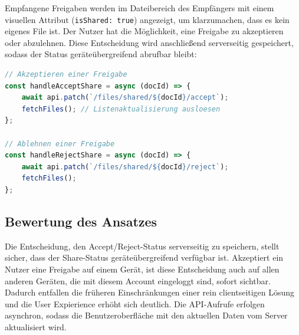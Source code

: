 Empfangene Freigaben werden im Dateibereich des Empfängers mit einem visuellen Attribut (\texttt{isShared: true}) angezeigt, um klarzumachen, dass es kein eigenes File ist. Der Nutzer hat die Möglichkeit, eine Freigabe zu akzeptieren oder abzulehnen. Diese Entscheidung wird anschließend serverseitig gespeichert, sodass der Status geräteübergreifend abrufbar bleibt:

\begin{lstlisting}[language=JavaScript, caption={Serverseitige Speicherung der Shares via API}]
// Akzeptieren einer Freigabe
const handleAcceptShare = async (docId) => {
    await api.patch(`/files/shared/${docId}/accept`);
    fetchFiles(); // Listenaktualisierung ausloesen
};

// Ablehnen einer Freigabe
const handleRejectShare = async (docId) => {
    await api.patch(`/files/shared/${docId}/reject`);
    fetchFiles();
};
\end{lstlisting}

\subsection{Bewertung des Ansatzes}

Die Entscheidung, den Accept/Reject-Status serverseitig zu speichern, stellt sicher, dass der Share-Status geräteübergreifend verfügbar ist. Akzeptiert ein Nutzer eine Freigabe auf einem Gerät, ist diese Entscheidung auch auf allen anderen Geräten, die mit diesem Account eingeloggt sind, sofort sichtbar. Dadurch entfallen die früheren Einschränkungen einer rein clientseitigen Lösung und die User Expierience erhöht sich deutlich. Die API-Aufrufe erfolgen asynchron, sodass die Benutzeroberfläche mit den aktuellen Daten vom Server aktualisiert wird.

